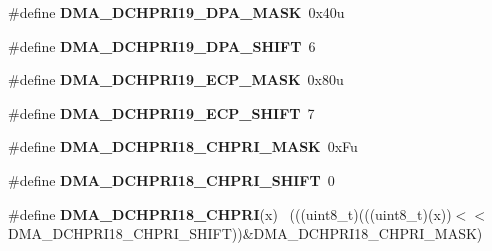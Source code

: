 \begin{DoxyCompactItemize}
\item 
\hypertarget{group___d_m_a___register___masks_gaad40f0b974abde27e3e24e901a07a9f4}{}\#define {\bfseries D\+M\+A\+\_\+\+D\+C\+H\+P\+R\+I19\+\_\+\+D\+P\+A\+\_\+\+M\+A\+S\+K}~0x40u\label{group___d_m_a___register___masks_gaad40f0b974abde27e3e24e901a07a9f4}

\item 
\hypertarget{group___d_m_a___register___masks_ga603cab4753d681013d3cd726845de0ce}{}\#define {\bfseries D\+M\+A\+\_\+\+D\+C\+H\+P\+R\+I19\+\_\+\+D\+P\+A\+\_\+\+S\+H\+I\+F\+T}~6\label{group___d_m_a___register___masks_ga603cab4753d681013d3cd726845de0ce}

\item 
\hypertarget{group___d_m_a___register___masks_ga816b4f826083486d4c67b6a71b9d7473}{}\#define {\bfseries D\+M\+A\+\_\+\+D\+C\+H\+P\+R\+I19\+\_\+\+E\+C\+P\+\_\+\+M\+A\+S\+K}~0x80u\label{group___d_m_a___register___masks_ga816b4f826083486d4c67b6a71b9d7473}

\item 
\hypertarget{group___d_m_a___register___masks_gaadcc1e39e378c077a5b493c6b56d9b04}{}\#define {\bfseries D\+M\+A\+\_\+\+D\+C\+H\+P\+R\+I19\+\_\+\+E\+C\+P\+\_\+\+S\+H\+I\+F\+T}~7\label{group___d_m_a___register___masks_gaadcc1e39e378c077a5b493c6b56d9b04}

\item 
\hypertarget{group___d_m_a___register___masks_gae50e649f7c5bc2e62b38d5e78783c3e7}{}\#define {\bfseries D\+M\+A\+\_\+\+D\+C\+H\+P\+R\+I18\+\_\+\+C\+H\+P\+R\+I\+\_\+\+M\+A\+S\+K}~0x\+Fu\label{group___d_m_a___register___masks_gae50e649f7c5bc2e62b38d5e78783c3e7}

\item 
\hypertarget{group___d_m_a___register___masks_ga2cb7a65b4eafbfeffb25cd52d8e816a4}{}\#define {\bfseries D\+M\+A\+\_\+\+D\+C\+H\+P\+R\+I18\+\_\+\+C\+H\+P\+R\+I\+\_\+\+S\+H\+I\+F\+T}~0\label{group___d_m_a___register___masks_ga2cb7a65b4eafbfeffb25cd52d8e816a4}

\item 
\hypertarget{group___d_m_a___register___masks_ga41ed8d3dc7522da99f53dded0a9eaf5e}{}\#define {\bfseries D\+M\+A\+\_\+\+D\+C\+H\+P\+R\+I18\+\_\+\+C\+H\+P\+R\+I}(x)                                    ~(((uint8\+\_\+t)(((uint8\+\_\+t)(x))$<$$<$D\+M\+A\+\_\+\+D\+C\+H\+P\+R\+I18\+\_\+\+C\+H\+P\+R\+I\+\_\+\+S\+H\+I\+F\+T))\&D\+M\+A\+\_\+\+D\+C\+H\+P\+R\+I18\+\_\+\+C\+H\+P\+R\+I\+\_\+\+M\+A\+S\+K)\label{group___d_m_a___register___masks_ga41ed8d3dc7522da99f53dded0a9eaf5e}


\end{DoxyCompactItemize}
